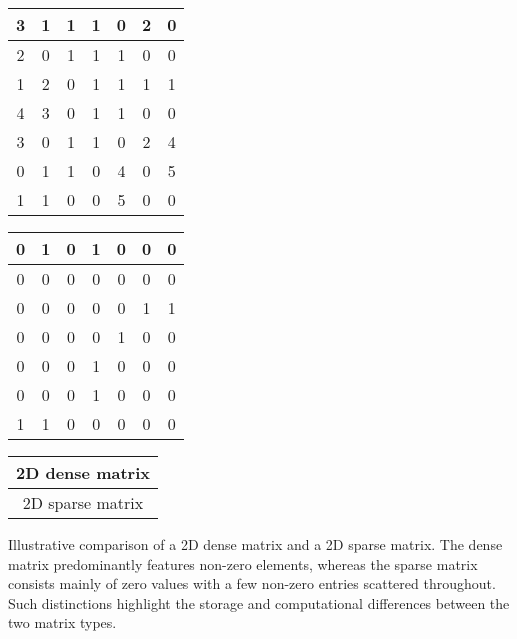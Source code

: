 \documentclass{article}
\begin{document}
\begin{center}
    \begin{tabular}{|c|c|c|c|c|c|c|}
    \hline
        3 & 1 & 1 & 1 & 0 & 2 & 0 \\
        \hline
        2 & 0 & 1 & 1 & 1 & 0 & 0 \\
        \hline
        1 & 2 & 0 & 1 & 1 & 1 & 1 \\
        \hline
        4 & 3 & 0 & 1 & 1 & 0 & 0 \\
        \hline
        3 & 0 & 1 & 1 & 0 & 2 & 4 \\
        \hline
        0 & 1 & 1 & 0 & 4 & 0 & 5 \\
        \hline
        1 & 1 & 0 & 0 & 5 & 0 & 0 \\
        \hline
    \end{tabular}
    \quad
    \begin{tabular}{|c|c|c|c|c|c|c|}
    \hline
        0 & 1 & 0 & 1 & 0 & 0 & 0 \\
        \hline
        0 & 0 & 0 & 0 & 0 & 0 & 0 \\
        \hline
        0 & 0 & 0 & 0 & 0 & 1 & 1 \\
        \hline
        0 & 0 & 0 & 0 & 1 & 0 & 0 \\
        \hline
        0 & 0 & 0 & 1 & 0 & 0 & 0 \\
        \hline
        0 & 0 & 0 & 1 & 0 & 0 & 0 \\
        \hline
        1 & 1 & 0 & 0 & 0 & 0 & 0 \\
        \hline
    \end{tabular}

    \vspace{5mm}

    \begin{tabular}{c}
        2D dense matrix \\
        \hline
        2D sparse matrix \\
    \end{tabular}

\end{center}

Illustrative comparison of a 2D dense matrix and a 2D sparse matrix. The dense matrix predominantly features non-zero elements, whereas the sparse matrix consists mainly of zero values with a few non-zero entries scattered throughout. Such distinctions highlight the storage and computational differences between the two matrix types.
\end{document}

